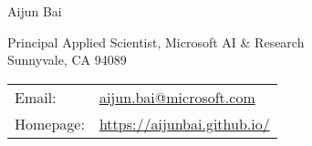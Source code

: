 \documentclass[letterpaper,10pt]{article}
\def\name{Aijun Bai}
\begin{document}
\begin{flushleft}
	{\huge \name}
\end{flushleft}

\bigskip

\begin{minipage}{0.5\textwidth}
	Principal Applied Scientist, Microsoft AI \& Research \\
	Sunnyvale, CA 94089
\end{minipage}
\begin{minipage}{0.5\textwidth}
	\begin{tabular}{ll}
		Email:    & \href{mailto:aijun.bai@microsoft.com}{\rm aijun.bai@microsoft.com} \\
		Homepage: & \url{https://aijunbai.github.io/} \\
	\end{tabular}
\end{minipage}

\vspace{15pt}
\end{document}
